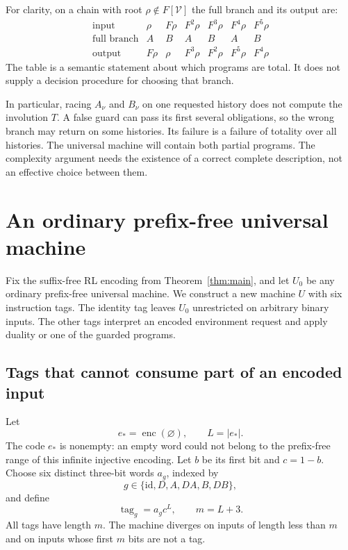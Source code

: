 \documentclass[11pt]{article}
\theoremstyle{definition}
\theoremstyle{remark}
\newcommand{\V}{\mathcal V}
\newcommand{\enc}{\operatorname{enc}}
\newcommand{\id}{\mathrm{id}}
\newcommand{\tagword}{\operatorname{tag}}
\begin{document}
For clarity, on a chain with root $\rho\notin F[\V]$ the full
branch and its output are:
\[
\begin{array}{c|cccccc}
 \text{input}&\rho&F\rho&F^2\rho&F^3\rho&F^4\rho&F^5\rho\\
 \hline
 \text{full branch}&A&B&A&B&A&B\\
 \text{output}&F\rho&\rho&F^3\rho&F^2\rho&F^5\rho&F^4\rho
\end{array}
\]
The table is a semantic statement about which programs are total.
It does not supply a decision procedure for choosing that branch.

In particular, racing $A_\nu$ and $B_\nu$ on one requested history
does not compute the involution $T$.  A false guard can pass its first
several obligations, so the wrong branch may return on some histories.
Its failure is a failure of totality over all histories.  The
universal machine will contain both partial programs.  The complexity
argument needs the existence of a correct complete description, not
an effective choice between them.

\section{An ordinary prefix-free universal machine}
\label{sec:machine}

Fix the suffix-free RL encoding from Theorem~\ref{thm:main}, and let
$U_0$ be any ordinary prefix-free universal machine.  We construct a
new machine $U$ with six instruction tags.  The identity tag leaves
$U_0$ unrestricted on arbitrary binary inputs.  The other tags
interpret an encoded environment request and apply duality or one of
the guarded programs.

\subsection{Tags that cannot consume part of an encoded input}

Let
\[
  e_* = \enc(\varnothing),\qquad L=|e_*|.
\]
The code $e_*$ is nonempty: an empty word could not belong to the
prefix-free range of this infinite injective encoding.  Let $b$ be
its first bit and $c=1-b$.  Choose six distinct three-bit words
$a_g$, indexed by
\[
  g\in\{\id,D,A,DA,B,DB\},
\]
and define
\begin{equation}
  \tagword_g=a_gc^L,\qquad m=L+3.
  \label{eq:tags}
\end{equation}
All tags have length $m$.  The machine diverges on inputs of length
less than $m$ and on inputs whose first $m$ bits are not a tag.
\end{document}
